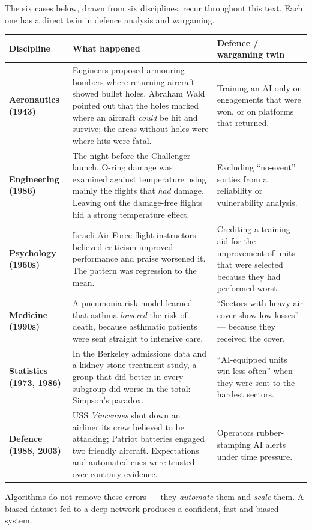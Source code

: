 \documentclass[11pt]{article}
\begin{document}
The six cases below, drawn from six disciplines, recur throughout this text. Each one has a direct twin in defence analysis and wargaming.

\begin{center}\small\renewcommand{\arraystretch}{1.3}
\begin{tabularx}{\textwidth}{>{\bfseries}p{2.3cm}X X}
\toprule Discipline & What happened & Defence / wargaming twin\\\midrule
Aeronautics (1943) & Engineers proposed armouring bombers where returning aircraft showed bullet holes. Abraham Wald pointed out that the holes marked where an aircraft \emph{could} be hit and survive; the areas without holes were where hits were fatal. & Training an AI only on engagements that were won, or on platforms that returned.\\
Engineering (1986) & The night before the Challenger launch, O-ring damage was examined against temperature using mainly the flights that \emph{had} damage. Leaving out the damage-free flights hid a strong temperature effect. & Excluding ``no-event'' sorties from a reliability or vulnerability analysis.\\
Psychology (1960s) & Israeli Air Force flight instructors believed criticism improved performance and praise worsened it. The pattern was regression to the mean. & Crediting a training aid for the improvement of units that were selected because they had performed worst.\\
Medicine (1990s) & A pneumonia-risk model learned that asthma \emph{lowered} the risk of death, because asthmatic patients were sent straight to intensive care. & ``Sectors with heavy air cover show low losses'' --- because they received the cover.\\
Statistics (1973, 1986) & In the Berkeley admissions data and a kidney-stone treatment study, a group that did better in every subgroup did worse in the total: Simpson's paradox. & ``AI-equipped units win less often'' when they were sent to the hardest sectors.\\
Defence (1988, 2003) & USS \textit{Vincennes} shot down an airliner its crew believed to be attacking; Patriot batteries engaged two friendly aircraft. Expectations and automated cues were trusted over contrary evidence. & Operators rubber-stamping AI alerts under time pressure.\\\bottomrule
\end{tabularx}\end{center}

\begin{keypoint}Algorithms do not remove these errors --- they \emph{automate} them and \emph{scale} them. A biased dataset fed to a deep network produces a confident, fast and biased system.\end{keypoint}
\end{document}
